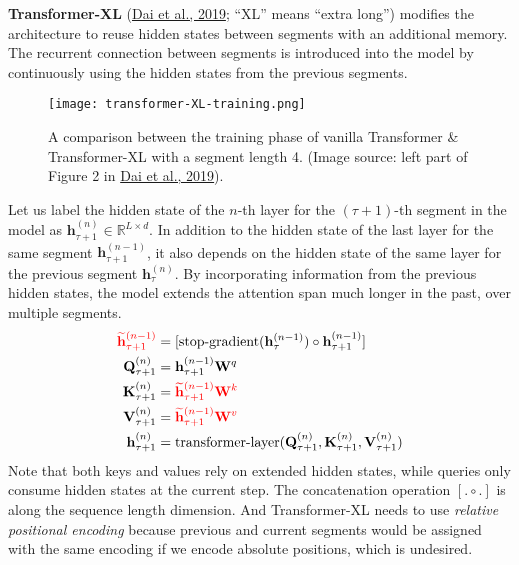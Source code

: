 \documentclass[12pt]{article}
\begin{document}
\textbf{Transformer-XL} (\href{https://arxiv.org/abs/1901.02860}{Dai et al., 2019}; ``XL'' means ``extra long'') modifies the architecture to reuse hidden states between segments with an additional memory. The recurrent connection between segments is introduced into the model by continuously using the hidden states from the previous segments.

\begin{figure}[h!]
    \centering
    \texttt{[image: transformer-XL-training.png]}
    \caption{A comparison between the training phase of vanilla Transformer \& Transformer-XL with a segment length 4. (Image source: left part of Figure 2 in \href{https://arxiv.org/abs/1901.02860}{Dai et al., 2019}).}
\end{figure}

Let us label the hidden state of the $n$-th layer for the $(\tau + 1)$-th segment in the model as $\mathbf{h}_{\tau+1}^{(n)} \in \mathbb{R}^{L \times d}$. In addition to the hidden state of the last layer for the same segment $\mathbf{h}_{\tau+1}^{(n-1)}$, it also depends on the hidden state of the same layer for the previous segment $\mathbf{h}_{\tau}^{(n)}$. By incorporating information from the previous hidden states, the model extends the attention span much longer in the past, over multiple segments.
\[
\begin{aligned}
\color{red}{\widetilde{\mathbf{h}}_{\tau+1}^{(n-1)}} &= [\text{stop-gradient}(\mathbf{h}_{\tau}^{(n-1)}) \circ \mathbf{h}_{\tau+1}^{(n-1)}] \\
\mathbf{Q}_{\tau+1}^{(n)} &= \mathbf{h}_{\tau+1}^{(n-1)}\mathbf{W}^q \\
\mathbf{K}_{\tau+1}^{(n)} &= \color{red}{\widetilde{\mathbf{h}}_{\tau+1}^{(n-1)}} \mathbf{W}^k \\
\mathbf{V}_{\tau+1}^{(n)} &= \color{red}{\widetilde{\mathbf{h}}_{\tau+1}^{(n-1)}} \mathbf{W}^v \\
\mathbf{h}_{\tau+1}^{(n)} &= \text{transformer-layer}(\mathbf{Q}_{\tau+1}^{(n)}, \mathbf{K}_{\tau+1}^{(n)}, \mathbf{V}_{\tau+1}^{(n)})
\end{aligned}
\]
Note that both keys and values rely on extended hidden states, while queries only consume hidden states at the current step. The concatenation operation $[. \circ .]$ is along the sequence length dimension. And Transformer-XL needs to use \emph{relative positional encoding} because previous and current segments would be assigned with the same encoding if we encode absolute positions, which is undesired.
\end{document}
